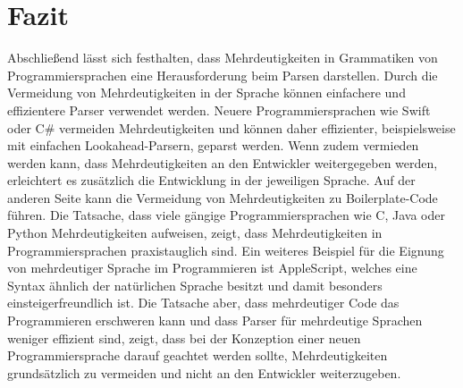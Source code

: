 \documentclass[runningheads]{llncs}
\begin{document}
    \section{Fazit}\label{sec:zusammenfassung}

    Abschließend lässt sich festhalten, dass Mehrdeutigkeiten in Grammatiken von Programmiersprachen
    eine Herausforderung beim Parsen darstellen.
    Durch die Vermeidung von Mehrdeutigkeiten in der Sprache können einfachere und effizientere Parser verwendet werden.
    Neuere Programmiersprachen wie Swift oder C\# vermeiden Mehrdeutigkeiten
    und können daher effizienter, beispielsweise mit einfachen Lookahead-Parsern, geparst werden.
    Wenn zudem vermieden werden kann, dass Mehrdeutigkeiten an den Entwickler weitergegeben werden,
    erleichtert es zusätzlich die Entwicklung in der jeweiligen Sprache.
    Auf der anderen Seite kann die Vermeidung von Mehrdeutigkeiten zu Boilerplate-Code führen.
    Die Tatsache, dass viele gängige Programmiersprachen wie C, Java oder Python Mehrdeutigkeiten aufweisen,
    zeigt, dass Mehrdeutigkeiten in Programmiersprachen praxistauglich sind.
    Ein weiteres Beispiel für die Eignung von mehrdeutiger Sprache im Programmieren ist AppleScript,
    welches eine Syntax ähnlich der natürlichen Sprache besitzt
    und damit besonders einsteigerfreundlich ist.
    Die Tatsache aber, dass mehrdeutiger Code das Programmieren erschweren kann
    und dass Parser für mehrdeutige Sprachen weniger effizient sind,
    zeigt, dass bei der Konzeption einer neuen Programmiersprache
    darauf geachtet werden sollte, Mehrdeutigkeiten grundsätzlich zu vermeiden
    und nicht an den Entwickler weiterzugeben.

%
%
%


    \nocite{*}
    
    
\end{document}
